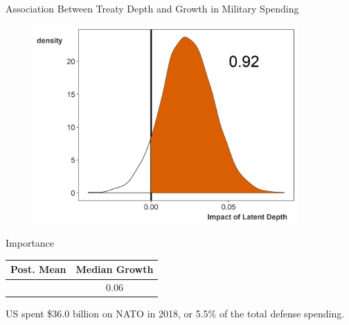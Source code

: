 \documentclass[12pt]{beamer}
\begin{document}
\begin{frame}{Association Between Treaty Depth and Growth in Military Spending} 

\begin{figure}
	\centering
		\includegraphics[width=0.90\textwidth]{depth-post.png}
	\label{fig:depth-post}
\end{figure}


\end{frame}



\begin{frame}[standout]{Importance} 

\begin{tabular}{cc}
 Post. Mean & Median Growth \\
\hline
\pause
 0.02 & 0.06  \\
\end{tabular}

\pause

US spent \$36.0 billion on NATO in 2018, or 5.5\% of the total defense spending. 


\end{frame}

\end{document}
